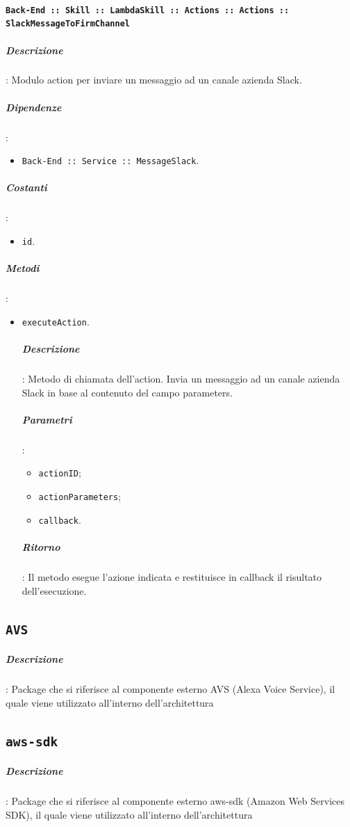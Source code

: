 \documentclass[../DefinizioneDiProdotto_v2.0.0.tex]{subfiles}
\begin{document}
\paragraph{\texttt{Back-End :: Skill :: LambdaSkill :: Actions :: Actions :: SlackMessageToFirmChannel}}
\subparagraph{Descrizione}: Modulo action per inviare un messaggio ad un canale azienda Slack.
\subparagraph{Dipendenze}:
\begin{itemize}
	\item \texttt{Back-End :: Service :: MessageSlack}.
\end{itemize}
\subparagraph{Costanti}:
\begin{itemize}
	\item \texttt{id}.
\end{itemize}
\subparagraph{Metodi}:
\begin{itemize}
	\item \texttt{executeAction}.
	      \subparagraph{Descrizione}: Metodo di chiamata dell'action. Invia un messaggio ad un canale azienda Slack in base al contenuto del campo parameters.
	      \subparagraph{Parametri}:
	      \begin{itemize}
	      	\item \texttt{actionID};
	      	\item \texttt{actionParameters};
	      	\item \texttt{callback}.
	      \end{itemize}
	      \subparagraph{Ritorno}: Il metodo esegue l'azione indicata e restituisce in callback il risultato dell'esecuzione.
\end{itemize}

\subsection{\texttt{AVS}}
	\subparagraph{Descrizione}: Package che si riferisce al componente esterno AVS (Alexa Voice Service), il quale viene utilizzato all'interno dell'architettura

\subsection{\texttt{aws-sdk}}

	\subparagraph{Descrizione}: Package che si riferisce al componente esterno aws-sdk (Amazon Web Services SDK), il quale viene utilizzato all'interno dell'architettura
\end{document}
